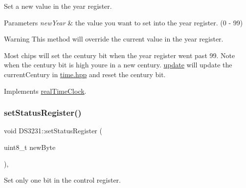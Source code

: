 Set a new value in the year register. 


\begin{DoxyParams}{Parameters}
{\em new\+Year} & the value you want to set into the year register. (0 -\/ 99) \\
\hline
\end{DoxyParams}
\begin{DoxyWarning}{Warning}
This method will override the current value in the year register. 

Most chips will set the century bit when the year register went past 99. Note when the century bit is high you\textquotesingle{}re in a new century. \mbox{\hyperlink{class_d_s3231_a143ec57122d892ea0ec671a153352f2c}{update}} will update the current\+Century in \mbox{\hyperlink{time_8hpp_source}{time.\+hpp}} and reset the century bit. 
\end{DoxyWarning}


Implements \mbox{\hyperlink{classreal_time_clock_a4d6e8056f52cea52bab5c635c0860c12}{real\+Time\+Clock}}.

\mbox{\label{class_d_s3231_a303a9a5123f66987e209396d60e329e8}} 
\subsubsection{\texorpdfstring{set\+Status\+Register()}{setStatusRegister()}}
{\footnotesize\ttfamily void D\+S3231\+::set\+Status\+Register (\begin{DoxyParamCaption}\item[{uint8\+\_\+t}]{new\+Byte }\end{DoxyParamCaption})\hspace{0.3cm}{\ttfamily [override]}, {\ttfamily [virtual]}}



Set only one bit in the control register. 



